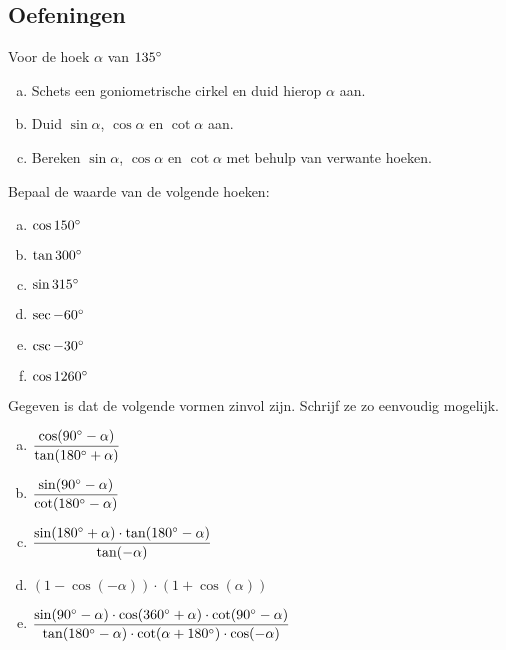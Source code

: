 \documentclass[twoside,a4paper,12pt]{article}
\begin{document}
\needspace{5cm}
\subsection{Oefeningen}

\begin{oefening}
Voor de hoek $\alpha$ van $135^\circ$
\begin{enumerate}[(a)]
  \itemsep0.2em
  \item Schets een goniometrische cirkel en duid hierop $\alpha$ aan.
  \item Duid $\sin \alpha$, $\cos \alpha$ en $\cot \alpha$ aan.
  \item Bereken $\sin \alpha$, $\cos \alpha$ en $\cot \alpha$ met behulp van verwante hoeken.
\end{enumerate}
\end{oefening}

\begin{oefening}
Bepaal de waarde van de volgende hoeken:
\begin{multicols}{2}
\begin{enumerate}[(a)]
  \itemsep.5em
  \item $\cos 150^\circ$
  \item $\tan 300^\circ$
  \item $\sin 315^\circ$
  \item $\sec -60^\circ$
  \item $\csc -30^\circ$
  \item $\cos 1260^\circ$
\end{enumerate}
\end{multicols}
\end{oefening}

\begin{oefening}
Gegeven is dat de volgende vormen zinvol zijn. Schrijf ze zo eenvoudig mogelijk.
\begin{enumerate}[(a)]
  \itemsep1em
  \item $\dfrac{\cos(90^\circ-\alpha)}{\tan(180^\circ+\alpha)}$
  \item $\dfrac{\sin(90^\circ-\alpha)}{\cot(180^\circ-\alpha)}$
  \item $\dfrac{\sin(180^\circ+\alpha)\cdot\tan(180^\circ-\alpha)}{\tan(-\alpha)}$
  \item $(1-\cos(-\alpha))\cdot(1+\cos(\alpha))$
  \item $\dfrac{\sin(90^\circ-\alpha)\cdot\cos(360^\circ+\alpha)\cdot\cot(90^\circ-\alpha)}{\tan(180^\circ-\alpha)\cdot\cot(\alpha+180^\circ)\cdot\cos(-\alpha)}$
\end{enumerate}
\end{oefening}
\end{document}
